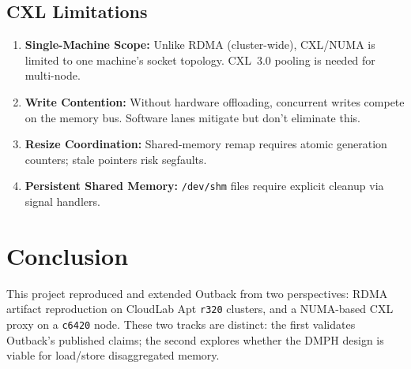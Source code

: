 \documentclass[conference]{IEEEtran}
\begin{document}
\subsection{CXL Limitations}

\begin{enumerate}[nosep]
  \item \textbf{Single-Machine Scope:} Unlike RDMA (cluster-wide), CXL/NUMA is limited to one machine's socket topology. CXL~3.0 pooling is needed for multi-node.
  \item \textbf{Write Contention:} Without hardware offloading, concurrent writes compete on the memory bus. Software lanes mitigate but don't eliminate this.
  \item \textbf{Resize Coordination:} Shared-memory remap requires atomic generation counters; stale pointers risk segfaults.
  \item \textbf{Persistent Shared Memory:} \texttt{/dev/shm} files require explicit cleanup via signal handlers.
\end{enumerate}

\section{Conclusion}

This project reproduced and extended Outback from two perspectives: RDMA artifact reproduction on CloudLab Apt \texttt{r320} clusters, and a NUMA-based CXL proxy on a \texttt{c6420} node. These two tracks are distinct: the first validates Outback's published claims; the second explores whether the DMPH design is viable for load/store disaggregated memory.
\end{document}
